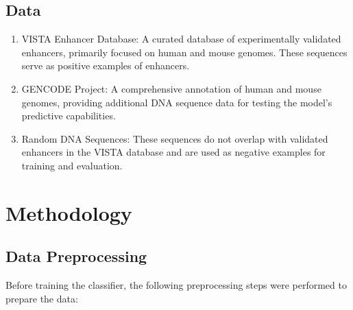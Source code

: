 \documentclass[11pt, a4paper, hidelinks]{article}
\begin{document}
\subsection{Data}\label{subsec:data}
\begin{enumerate}
    \item VISTA Enhancer Database: A curated database of experimentally validated enhancers, primarily focused on human and mouse genomes. These sequences serve as positive examples of enhancers.
    \item GENCODE Project: A comprehensive annotation of human and mouse genomes, providing additional DNA sequence data for testing the model's predictive capabilities.
    \item Random DNA Sequences: These sequences do not overlap with validated enhancers in the VISTA database and are used as negative examples for training and evaluation.
\end{enumerate}


\section{Methodology}\label{sec:methodology}

\subsection{Data Preprocessing}\label{subsec:data-preprocessing}

Before training the classifier, the following preprocessing steps were performed to prepare the data:
\end{document}
